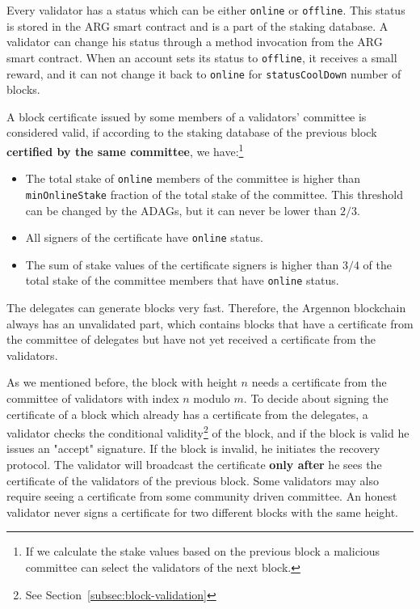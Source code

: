 Every validator has a status which can be either \texttt{online} or \texttt{offline}.
This status is stored in the ARG smart contract and is a part of the staking database. A validator can change
his status through a method invocation
from the ARG smart contract. When an account sets its status to \texttt{offline}, it receives a small reward, and
it can not change it back to \texttt{online} for \texttt{statusCoolDown} number of blocks.


A block certificate issued by some members of a validators' committee is considered valid, if according to
the staking database of the previous block \textbf{certified by the same committee}, we have:\footnote{If we calculate
the stake values based on the previous block a malicious committee can select the validators of the next block.}
\begin{itemize}
    \item The total stake of \texttt{online} members of the committee is higher than \texttt{minOnlineStake} fraction
    of the total stake of the committee. This threshold can be changed by the ADAGs, but it can never be lower
    than $2/3$.
    \item All signers of the certificate have \texttt{online} status.
    \item The sum of stake values of the certificate signers is higher than $3/4$ of the total stake
    of the committee members that have \texttt{online} status.
\end{itemize}

The delegates can generate blocks very fast. Therefore, the Argennon blockchain always has an
unvalidated part, which contains blocks that have a certificate from the committee of delegates but have not
yet received a certificate from the validators.

As we mentioned before, the block with height $n$ needs a certificate from the committee of
validators with index $n$ modulo $m$. To decide about signing the certificate of a block which already has
a certificate from the delegates, a validator checks the conditional
validity\footnote{See Section~\ref{subsec:block-validation}} of the block, and
if the block is valid he issues
an "accept" signature. If the block is invalid, he initiates the recovery protocol. The validator will broadcast the
certificate \textbf{only after} he sees the certificate of the validators of the previous block.
Some validators may also require seeing a certificate from
some community driven committee. An honest validator never signs a certificate for two different blocks with the
same height.


